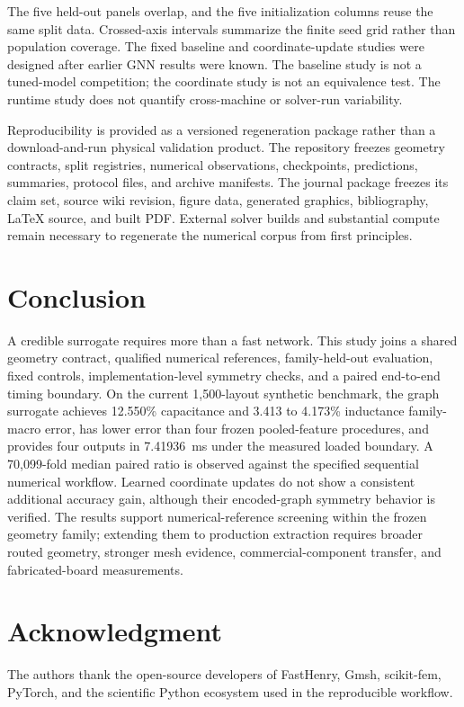 \documentclass[journal]{IEEEtran}
\begin{document}
The five held-out panels overlap, and the five initialization columns reuse the same split data. Crossed-axis intervals summarize the finite seed grid rather than population coverage. The fixed baseline and coordinate-update studies were designed after earlier GNN results were known. The baseline study is not a tuned-model competition; the coordinate study is not an equivalence test. The runtime study does not quantify cross-machine or solver-run variability.

Reproducibility is provided as a versioned regeneration package rather than a download-and-run physical validation product. The repository freezes geometry contracts, split registries, numerical observations, checkpoints, predictions, summaries, protocol files, and archive manifests. The journal package freezes its claim set, source wiki revision, figure data, generated graphics, bibliography, LaTeX source, and built PDF. External solver builds and substantial compute remain necessary to regenerate the numerical corpus from first principles.

\section{Conclusion}
A credible surrogate requires more than a fast network. This study joins a shared geometry contract, qualified numerical references, family-held-out evaluation, fixed controls, implementation-level symmetry checks, and a paired end-to-end timing boundary. On the current 1,500-layout synthetic benchmark, the graph surrogate achieves 12.550\% capacitance and 3.413 to 4.173\% inductance family-macro error, has lower error than four frozen pooled-feature procedures, and provides four outputs in 7.41936~ms under the measured loaded boundary. A 70,099-fold median paired ratio is observed against the specified sequential numerical workflow. Learned coordinate updates do not show a consistent additional accuracy gain, although their encoded-graph symmetry behavior is verified. The results support numerical-reference screening within the frozen geometry family; extending them to production extraction requires broader routed geometry, stronger mesh evidence, commercial-component transfer, and fabricated-board measurements.

\section*{Acknowledgment}
The authors thank the open-source developers of FastHenry, Gmsh, scikit-fem, PyTorch, and the scientific Python ecosystem used in the reproducible workflow.



\end{document}
